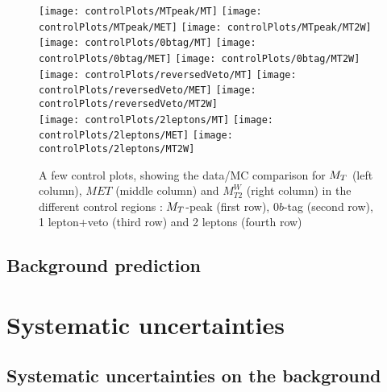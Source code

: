             \begin{figure}[h!]
                \centering
                \texttt{[image: controlPlots/MTpeak/MT]}
                \texttt{[image: controlPlots/MTpeak/MET]}
                \texttt{[image: controlPlots/MTpeak/MT2W]}\\
                \texttt{[image: controlPlots/0btag/MT]}
                \texttt{[image: controlPlots/0btag/MET]}
                \texttt{[image: controlPlots/0btag/MT2W]}\\
                \texttt{[image: controlPlots/reversedVeto/MT]}
                \texttt{[image: controlPlots/reversedVeto/MET]}
                \texttt{[image: controlPlots/reversedVeto/MT2W]}\\
                \texttt{[image: controlPlots/2leptons/MT]}
                \texttt{[image: controlPlots/2leptons/MET]}
                \texttt{[image: controlPlots/2leptons/MT2W]}\\
                \caption{A few control plots, showing the data/MC comparison for $M_T$ (left column), 
                        $MET$ (middle column) and $M_{T2}^W$ (right column) in the different control
                        regions : $M_T$-peak (first row), $0b$-tag (second row), 1 lepton+veto (third
                        row) and 2 leptons (fourth row)}
                \label{fig:derpi}
            \end{figure}

        \subsection{Background prediction}


    \section{Systematic uncertainties \label{sec:analysis_systematics}}
        \loremipsum

        \subsection{Systematic uncertainties on the background \label{sec:background_systematics}}

